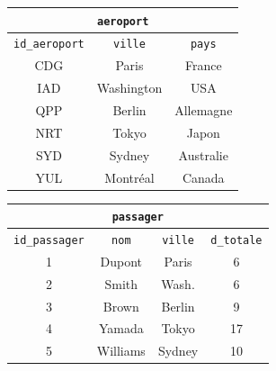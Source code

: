 \begin{table}[h]
    \centering
    \renewcommand{\arraystretch}{1.5}

    
    \begin{minipage}[t]{0.48\textwidth}
        \centering
        \begin{tabular}{|c|c|c|}
            \hline
            \multicolumn{3}{|c|}{\texttt{aeroport}} \\ \hline
            \texttt{id\_aeroport} & \texttt{ville} & \texttt{pays} \\ \hline
            CDG & Paris      & France    \\ \hline
            IAD & Washington & USA       \\ \hline
            QPP & Berlin     & Allemagne \\ \hline
            NRT & Tokyo      & Japon     \\ \hline
            SYD & Sydney     & Australie \\ \hline
            YUL & Montréal   & Canada    \\ \hline
        \end{tabular}
    \end{minipage}
    \hfill
    \begin{minipage}[t]{0.48\textwidth}
        \centering
        \begin{tabular}{|c|c|c|c|}
            \hline
            \multicolumn{4}{|c|}{\texttt{passager}} \\ \hline
            \texttt{id\_passager} & \texttt{nom} & \texttt{ville} & \texttt{d\_totale} \\ \hline
            1 & Dupont   & Paris      & 6  \\ \hline
            2 & Smith    & Wash.      & 6  \\ \hline
            3 & Brown    & Berlin     & 9  \\ \hline
            4 & Yamada   & Tokyo      & 17 \\ \hline
            5 & Williams & Sydney     & 10 \\ \hline
        \end{tabular}
    \end{minipage}

    \vspace{1.5cm} %



\end{table}
